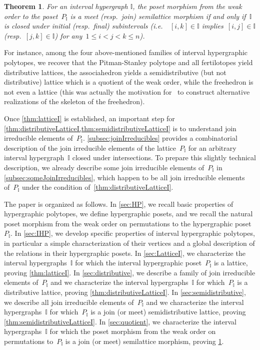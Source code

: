 \documentclass{amsart}
\newtheorem{theoremA}{Theorem}
\theoremstyle{definition}
\newcommand{\ie}{\textit{i.e.}~} %
\newcommand{\II}{\mathbb I} %
\begin{document}
\begin{theoremA}
\label{thm:quotientLatticeI}
For an interval hypergraph $\II$, the poset morphism from the weak order to the poset~$P_\II$ is a meet (resp.~join) semilattice morphism if and only if~$\II$ is closed under initial (resp.~final) subintervals (\ie~$[i,k] \in \II$ implies~$[i,j] \in \II$ (resp.~$[j,k] \in \II$) for any~$1 \le i < j < k \le n$).
\end{theoremA}

For instance, among the four above-mentioned families of interval hypergraphic polytopes, we recover that  the Pitman-Stanley polytope and all fertilotopes yield distributive lattices, the associahedron yields a semidistributive (but not distributive) lattice which is a quotient of the weak order, while the freehedron is not even a lattice (this was actually the motivation for~\cite{PilaudPoliakova} to construct alternative realizations of the skeleton of the freehedron).

Once \cref{thm:latticeI} is established, an important step for \cref{thm:distributiveLatticeI,thm:semidistributiveLatticeI} is to understand join irreducible elements of~$P_\II$.
\cref{subsec:joinIrreducibles} provides a combinatorial description of the join irreducible elements of the lattice~$P_\II$ for an arbitrary interval hypergraph~$\II$ closed under intersections.
To prepare this slightly technical description, we already describe some join irreducible elements of~$P_\II$ in \cref{subsec:someJoinIrreducibles}, which happen to be all join irreducible elements of~$P_\II$ under the condition of~\cref{thm:distributiveLatticeI}.

The paper is organized as follows.
In \cref{sec:HP}, we recall basic properties of hypergraphic polytopes, we define hypergraphic posets, and we recall the natural poset morphism from the weak order on permutations to the hypergraphic poset~$P_\II$.
In \cref{sec:IHP}, we develop specific properties of interval hypergraphic polytopes, in particular a simple characterization of their vertices and a global description of the relations in their hypergraphic posets.
In \cref{sec:LatticeI}, we characterize the interval hypergraphs~$\II$ for which the interval hypergraphic poset~$P_\II$ is a lattice, proving \cref{thm:latticeI}.
In \cref{sec:distributive}, we describe a family of join irreducible elements of~$P_\II$ and we characterize the interval hypergraphs~$\II$ for which~$P_\II$ is a distributive lattice, proving \cref{thm:distributiveLatticeI}.
In \cref{sec:semidistributive}, we describe all join irreducible elements of~$P_\II$ and we characterize the interval hypergraphs~$\II$ for which~$P_\II$ is a join (or meet) semidistributive lattice, proving \cref{thm:semidistributiveLatticeI}.
In \cref{sec:quotient}, we characterize the interval hypergraphs~$\II$ for which the poset morphism from the weak order on permutations to~$P_\II$ is a join (or meet) semilattice morphism, proving \cref{thm:quotientLatticeI}.
\end{document}
